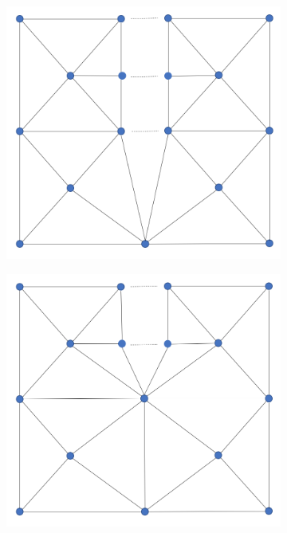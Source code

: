 \documentclass{article}
\begin{document}
\begin{figure}[H] \label{fig:submeshes_align}
  \centering
  \begin{subfigure}[b]{0.2\linewidth}
    \includegraphics[width=\linewidth]{Fig_mesh_merge_01.png}
    \caption{}
  \end{subfigure}
  \begin{subfigure}[b]{0.2\linewidth}
    \includegraphics[width=\linewidth]{Fig_mesh_merge_02.png}

\end{subfigure}
\end{figure}
\end{document}
